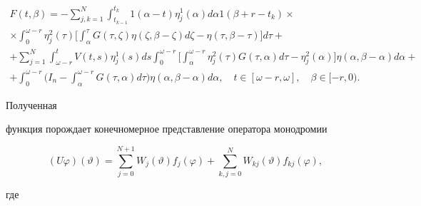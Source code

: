 \begin{multline*}


F(t, \beta) =- \sum_{j,k=1}^{N} \int_{t_{k-1}


}^{t_{k} } 1(\alpha-t) \eta_{j}^{1}(\alpha)


 d \alpha 1(\beta+r-t_{k}) \times \\


%


\times \int_{0}^{\omega-r} \eta_{j}^{2}(\tau)


\bigg[\int_{\alpha}^{\tau} G(\tau, \zeta) \eta(\zeta, \beta- \zeta) d \zeta-


\eta(\tau, \beta- \tau)\bigg] d \tau+ \\


%


+ \sum_{j=1}^{N} \int_{\omega-r}^{t} V(t,s) \eta_{j}^{1}(s) ds


 \int_{0}^{\omega-r}\bigg[\int_{\alpha}^{\omega-r} \eta_{j}^{2}(\tau)


 G(\tau, \alpha) d \tau- \eta_{j}^{2}(\alpha)\bigg]


\eta(\alpha, \beta- \alpha) d \alpha+ \\


%


+ \int_{0}^{\omega-r}\bigg(I_{n}-\int_{\alpha}^{\omega-r}


G(\tau, \alpha) d \tau\bigg)


\eta(\alpha, \beta- \alpha) d \alpha,


\quad t \in[\omega-r, \omega], \quad \beta \in[-r,0).


\end{multline*}


Полученная


функция порождает конечномерное представление оператора монодромии


$$


(U \varphi)(\vartheta) = \sum_{j=0}^{N+1}W_{j}(\vartheta)


f_{j}(\varphi) + \sum_{k,j=0}^{N}W_{kj}(\vartheta)


f_{kj}(\varphi),


$$


где


